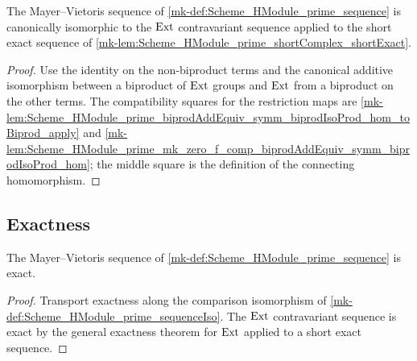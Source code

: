 \begin{definition}\label{mk-def:Scheme_HModule_prime_sequenceIso}
  \leanok


  The Mayer--Vietoris sequence of \ref{mk-def:Scheme_HModule_prime_sequence} is canonically isomorphic to the \(\operatorname{Ext}\) contravariant sequence applied to the short exact sequence of \ref{mk-lem:Scheme_HModule_prime_shortComplex_shortExact}.
\end{definition}

\begin{proof}
  \leanok

  Use the identity on the non-biproduct terms and the canonical additive isomorphism between a biproduct of \(\operatorname{Ext}\) groups and \(\operatorname{Ext}\) from a biproduct on the other terms. The compatibility squares for the restriction maps are \ref{mk-lem:Scheme_HModule_prime_biprodAddEquiv_symm_biprodIsoProd_hom_toBiprod_apply} and \ref{mk-lem:Scheme_HModule_prime_mk_zero_f_comp_biprodAddEquiv_symm_biprodIsoProd_hom}; the middle square is the definition of the connecting homomorphism.
\end{proof}

\subsection{Exactness}

\begin{theorem}\label{mk-thm:Scheme_HModule_prime_sequence_exact}
  \leanok


  The Mayer--Vietoris sequence of \ref{mk-def:Scheme_HModule_prime_sequence} is exact.
\end{theorem}

\begin{proof}
  \leanok

  Transport exactness along the comparison isomorphism of \ref{mk-def:Scheme_HModule_prime_sequenceIso}. The \(\operatorname{Ext}\) contravariant sequence is exact by the general exactness theorem for \(\operatorname{Ext}\) applied to a short exact sequence.
\end{proof}

